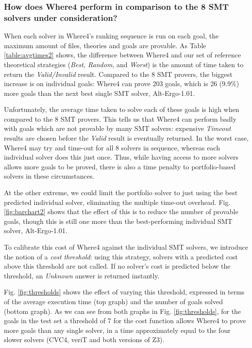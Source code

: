 \documentclass[runningheads,a4paper]{llncs}
\begin{document}
\subsubsection*{How does \textsf{Where4} perform in comparison to the 8 SMT solvers under consideration?}
When each solver in \textsf{Where4}'s ranking sequence is run on each goal, the maximum amount of files, theories and goals are provable. As Table \ref{table:avgtimes2} shows, the difference between \textsf{Where4} and our set of reference theoretical strategies (\textit{Best, Random}, and \textit{Worst}) is the amount of time taken to return the \textit{Valid/Invalid} result. Compared to the 8 SMT provers, the biggest increase is on individual goals: \textsf{Where4} can prove 203 goals, which is 26 (9.9\%) more goals than the next best single SMT solver, Alt-Ergo-1.01.

Unfortunately, the average time taken to solve each of these goals is high when compared to the 8 SMT provers. This tells us that \textsf{Where4} can perform badly with goals which are not provable by many SMT solvers: expensive \textit{Timeout} results are chosen before the \textit{Valid} result is eventually returned.   In the worst case, \textsf{Where4} may try and time-out for all 8 solvers in sequence, whereas each individual solver does this just once.   Thus, while having access to more solvers allows more goals to be proved, there is also a time penalty to portfolio-based solvers in these circumstances.

At the other extreme, we could limit the portfolio solver to just using the best predicted individual solver, eliminating the multiple time-out overhead.
Fig. \ref{fig:barchart2} shows that the effect of this is to reduce the number of provable goals, though this is still one more than the best-performing individual SMT solver, Alt-Ergo-1.01.

To calibrate this cost of \textsf{Where4} against the individual SMT solvers, we introduce the notion of a \textit{cost threshold}: using this strategy, solvers with a predicted cost above this threshold are not called. If no solver's cost is predicted below the threshold, an \textit{Unknown} answer is returned instantly.  

Fig. \ref{fig:thresholds} shows the effect of varying this threshold, expressed in terms of the average execution time (top graph) and the number of goals solved (bottom graph).  As we can see from both graphs in Fig. \ref{fig:thresholds}, for the goals in the test set a threshold of 7 for the cost function allows \textsf{Where4} to prove more goals than any single solver, in a time approximately equal to the four slower solvers (CVC4, veriT and both versions of Z3). 
\end{document}
